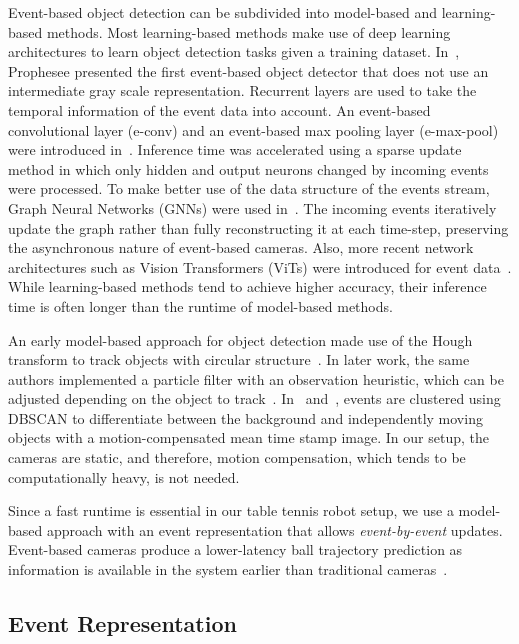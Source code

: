Event-based object detection can be subdivided into model-based and learning-based methods.
%
Most learning-based methods make use of deep learning architectures to learn object detection tasks given a training dataset.
%
In~\cite{Perot2020neurips}, Prophesee presented the first event-based object detector that does not use an intermediate gray scale representation.
%
%
Recurrent layers are used to take the temporal information of the event data into account.
%
An event-based convolutional layer (e-conv) and an event-based max pooling layer (e-max-pool) were introduced in~\cite{Cannici2019cvprw}.
%
Inference time was accelerated using a sparse update method in which only hidden and output neurons changed by incoming events were processed.
%
To make better use of the data structure of the events stream, Graph Neural Networks (GNNs) were used in~\cite{Schaefer2022cvpr}.
%
The incoming events iteratively update the graph rather than fully reconstructing it at each time-step, preserving the asynchronous nature of event-based cameras.
%
Also, more recent network architectures such as Vision Transformers (ViTs) were introduced for event data~\cite{Liu2024wacv}.
%
While learning-based methods tend to achieve higher accuracy, their inference time is often longer than the runtime of model-based methods.

An early model-based approach for object detection made use of the Hough transform to track objects with circular structure~\cite{Glover2016iros}.
%
In later work, the same authors implemented a particle filter with an observation heuristic, which can be adjusted depending on the object to track~\cite{Glover2017iros}.
%
In~\cite{Forrai2023icra} and~\cite{Falanga2020sr}, events are clustered using DBSCAN to differentiate between the background and independently moving objects with a motion-compensated mean time stamp image.
%
In our setup, the cameras are static, and therefore, motion compensation, which tends to be computationally heavy, is not needed.

Since a fast runtime is essential in our table tennis robot setup, we use a model-based approach with an event representation that allows \textit{event-by-event} updates.
%
Event-based cameras produce a lower-latency ball trajectory prediction as information is available in the system earlier than traditional cameras~\cite{Monforte2020aicas}. 


\subsection{Event Representation}\label{subsec:rel_er}


